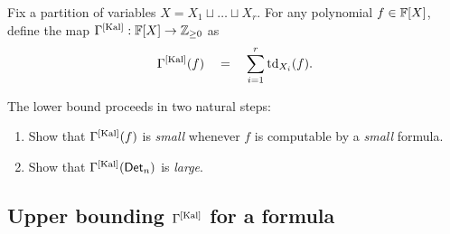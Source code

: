 Fix a partition of variables $X = X_1 \sqcup \dots \sqcup X_r$.
For any polynomial $f\in \mathbb{F}[X]$, define the map $\Gamma^{\mathrm{[Kal]}}:\mathbb{F}[X]\rightarrow \mathbb{Z}_{\geq 0}$ as
$$
\Gamma^{\mathrm{[Kal]}}(f) \quad=\quad \sum_{i=1}^r \mathrm{td}_{X_i}(f).
$$

The lower bound proceeds in two natural steps:
\begin{enumerate}
\item Show that $\Gamma^{\mathrm{[Kal]}}(f)$ is \emph{small} whenever $f$ is computable by a \emph{small} formula. 
\item Show that $\Gamma^{\mathrm{[Kal]}}(\operatorname{\mathsf{Det}}_n)$ is \emph{large}. 
\end{enumerate}

\subsection{Upper bounding $\Gamma^{\mathrm{[Kal]}}$ for a formula}

